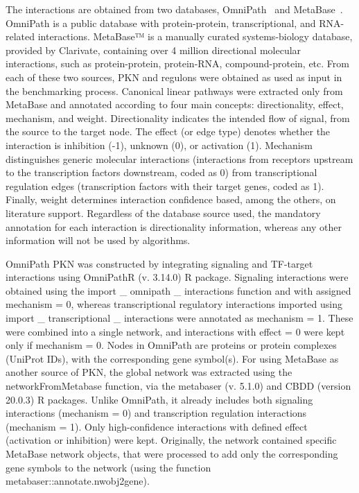 The interactions are obtained from two databases, OmniPath~\cite{RN91} and MetaBase~\cite{RN33}. 
OmniPath is a public database with protein-protein, transcriptional, and \gls{RNA}-related interactions. MetaBase™ is a manually curated systems-biology database, provided by Clarivate, containing over 4 million directional molecular interactions, such as protein-protein, protein-\gls{RNA}, compound-protein, etc. 
From each of these two sources, PKN and regulons were obtained as used as input in the benchmarking process. Canonical linear pathways were extracted only from MetaBase and annotated according to four main concepts: directionality, effect, mechanism, and weight. 
Directionality indicates the intended flow of signal, from the source to the target node. 
The effect (or edge type) denotes whether the interaction is inhibition (-1), unknown (0), or activation (1). 
Mechanism distinguishes generic molecular interactions (interactions from receptors upstream to the transcription factors downstream, coded as 0) from transcriptional regulation edges (transcription factors with their target genes, coded as 1). 
Finally, weight determines interaction confidence based, among the others, on literature support. Regardless of the database source used, the mandatory annotation for each interaction is directionality information, whereas any other information will not be used by algorithms. 

OmniPath \gls{PKN} was constructed by integrating signaling and \gls{TF}-target interactions using OmniPathR (v. 3.14.0) \gls{R} package. 
Signaling interactions were obtained using the import \_ omnipath \_ interactions function and with assigned mechanism = 0, whereas transcriptional regulatory interactions imported using import \_ transcriptional \_ interactions were annotated as mechanism = 1. 
These were combined into a single network, and interactions with effect = 0 were kept only if mechanism = 0. Nodes in OmniPath are proteins or protein complexes (UniProt IDs), with the corresponding gene symbol(s). 
For using MetaBase as another source of PKN, the global network was extracted using the networkFromMetabase function, via the metabaser (v. 5.1.0) and \gls{CBDD} (version 20.0.3) R packages. 
Unlike OmniPath, it already includes both signaling interactions (mechanism = 0) and transcription regulation interactions (mechanism = 1). 
Only high-confidence interactions with defined effect (activation or inhibition) were kept. 
Originally, the network contained specific MetaBase network objects, that were processed to add only the corresponding gene symbols to the network (using the function metabaser::annotate.nwobj2gene).

